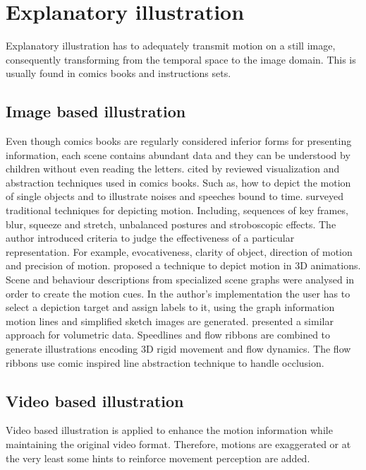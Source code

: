 \section{Explanatory illustration}

Explanatory illustration has to adequately transmit motion on a still image, consequently transforming from the temporal space to the image domain.
This is usually found in comics books and instructions sets.\\

\subsection{Image based illustration}

Even though comics books are regularly considered inferior forms for presenting information, each scene contains abundant data and they can be understood by children without even reading the letters.
\cite{McCloud1993} cited by \cite{Cutting2002} reviewed visualization and abstraction techniques used in comics books.
Such as, how to depict the motion of single objects and to illustrate noises and speeches bound to time.
\cite{Cutting2002} surveyed traditional techniques for depicting motion.
Including, sequences of key frames, blur, squeeze and stretch, unbalanced postures and stroboscopic effects.
The author introduced criteria to judge the effectiveness of a particular representation.
For example, evocativeness, clarity of object, direction of motion and precision of motion.
\cite{Nienhaus2005} proposed a technique to depict motion in 3D animations.
Scene and behaviour descriptions from specialized scene graphs were analysed in order to create the motion cues.
In the author's implementation the user has to select a depiction target and assign labels to it, using the graph information motion lines and simplified sketch images are generated.
\cite{Joshi2005} presented a similar approach for volumetric data.
Speedlines and flow ribbons are combined to generate illustrations encoding 3D rigid movement and flow dynamics.
The flow ribbons use comic inspired line abstraction technique to handle occlusion.

\subsection{Video based illustration}

Video based illustration is applied to enhance the motion information while maintaining the original video format.
Therefore, motions are exaggerated or at the very least some hints to reinforce movement perception are added.\\

